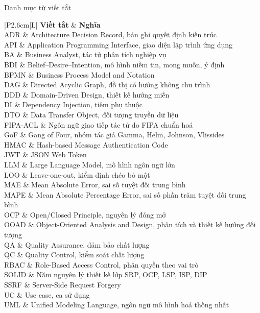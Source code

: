 \begin{contentlistingsection}{Danh mục từ viết tắt}
\noindent\begin{tabularx}{\textwidth}{|P{2.6cm}|L|}
\hline
\textbf{Viết tắt} & \textbf{Nghĩa} \\ \hline
ADR & Architecture Decision Record, bản ghi quyết định kiến trúc \\ \hline
API & Application Programming Interface, giao diện lập trình ứng dụng \\ \hline
BA & Business Analyst, tác tử phân tích nghiệp vụ \\ \hline
BDI & Belief--Desire--Intention, mô hình niềm tin, mong muốn, ý định \\ \hline
BPMN & Business Process Model and Notation \\ \hline
DAG & Directed Acyclic Graph, đồ thị có hướng không chu trình \\ \hline
DDD & Domain-Driven Design, thiết kế hướng miền \\ \hline
DI & Dependency Injection, tiêm phụ thuộc \\ \hline
DTO & Data Transfer Object, đối tượng truyền dữ liệu \\ \hline
FIPA-ACL & Ngôn ngữ giao tiếp tác tử do FIPA chuẩn hoá \\ \hline
GoF & Gang of Four, nhóm tác giả Gamma, Helm, Johnson, Vlissides \\ \hline
HMAC & Hash-based Message Authentication Code \\ \hline
JWT & JSON Web Token \\ \hline
LLM & Large Language Model, mô hình ngôn ngữ lớn \\ \hline
LOO & Leave-one-out, kiểm định chéo bỏ một \\ \hline
MAE & Mean Absolute Error, sai số tuyệt đối trung bình \\ \hline
MAPE & Mean Absolute Percentage Error, sai số phần trăm tuyệt đối trung bình \\ \hline
OCP & Open/Closed Principle, nguyên lý đóng mở \\ \hline
OOAD & Object-Oriented Analysis and Design, phân tích và thiết kế hướng đối tượng \\ \hline
QA & Quality Assurance, đảm bảo chất lượng \\ \hline
QC & Quality Control, kiểm soát chất lượng \\ \hline
RBAC & Role-Based Access Control, phân quyền theo vai trò \\ \hline
SOLID & Năm nguyên lý thiết kế lớp SRP, OCP, LSP, ISP, DIP \\ \hline
SSRF & Server-Side Request Forgery \\ \hline
UC & Use case, ca sử dụng \\ \hline
UML & Unified Modeling Language, ngôn ngữ mô hình hoá thống nhất \\ \hline
\end{tabularx}
\end{contentlistingsection}
